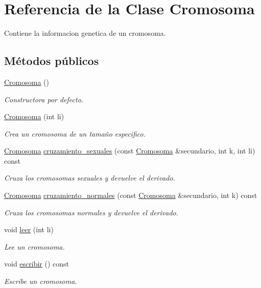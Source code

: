 \hypertarget{class_cromosoma}{}\section{Referencia de la Clase Cromosoma}
\label{class_cromosoma}


Contiene la informacion genetica de un cromosoma.  


\subsection*{Métodos públicos}
\begin{DoxyCompactItemize}
\item 
\hyperlink{class_cromosoma_a8367f3dd60c6af083aed533c69f17b29}{Cromosoma} ()
\begin{DoxyCompactList}\small\item\em Constructora por defecto. \end{DoxyCompactList}\item 
\hyperlink{class_cromosoma_a846b63ce7e4c4db0060336afd62a4d20}{Cromosoma} (int li)
\begin{DoxyCompactList}\small\item\em Crea un cromosoma de un tamaño especifico. \end{DoxyCompactList}\item 
\hyperlink{class_cromosoma}{Cromosoma} \hyperlink{class_cromosoma_ac3f049c73703bdf492cfa8e0daa86d48}{cruzamiento\+\_\+sexuales} (const \hyperlink{class_cromosoma}{Cromosoma} \&secundario, int k, int li) const 
\begin{DoxyCompactList}\small\item\em Cruza los cromosomas sexuales y devuelve el derivado. \end{DoxyCompactList}\item 
\hyperlink{class_cromosoma}{Cromosoma} \hyperlink{class_cromosoma_a18ee9f62a268890626c3bef450a1af54}{cruzamiento\+\_\+normales} (const \hyperlink{class_cromosoma}{Cromosoma} \&secundario, int k) const 
\begin{DoxyCompactList}\small\item\em Cruza los cromosomas normales y devuelve el derivado. \end{DoxyCompactList}\item 
void \hyperlink{class_cromosoma_abf3ef15e3f9af661572a768029e9c959}{leer} (int li)
\begin{DoxyCompactList}\small\item\em Lee un cromosoma. \end{DoxyCompactList}\item 
void \hyperlink{class_cromosoma_aed23a49a09e966c250767513e416df61}{escribir} () const 
\begin{DoxyCompactList}\small\item\em Escribe un cromosoma. \end{DoxyCompactList}\end{DoxyCompactItemize}


